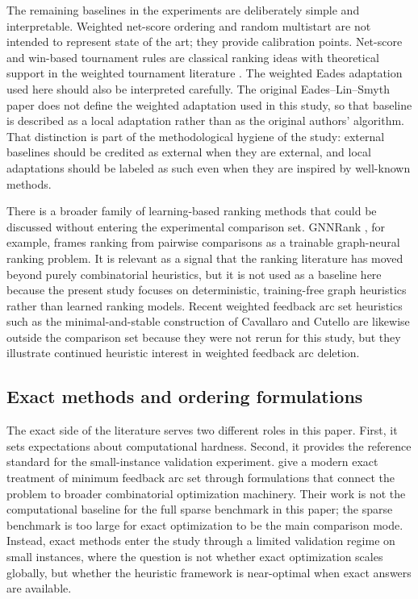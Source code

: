 The remaining baselines in the experiments are deliberately simple and interpretable. Weighted net-score ordering and random multistart are not intended to represent state of the art; they provide calibration points. Net-score and win-based tournament rules are classical ranking ideas with theoretical support in the weighted tournament literature \cite{CFR10}. The weighted Eades adaptation used here should also be interpreted carefully. The original Eades--Lin--Smyth paper \cite{ELS93} does not define the weighted adaptation used in this study, so that baseline is described as a local adaptation rather than as the original authors' algorithm. That distinction is part of the methodological hygiene of the study: external baselines should be credited as external when they are external, and local adaptations should be labeled as such even when they are inspired by well-known methods.

There is a broader family of learning-based ranking methods that could be discussed without entering the experimental comparison set. GNNRank \cite{GNNRank22}, for example, frames ranking from pairwise comparisons as a trainable graph-neural ranking problem. It is relevant as a signal that the ranking literature has moved beyond purely combinatorial heuristics, but it is not used as a baseline here because the present study focuses on deterministic, training-free graph heuristics rather than learned ranking models. Recent weighted feedback arc set heuristics such as the minimal-and-stable construction of Cavallaro and Cutello \cite{CC25} are likewise outside the comparison set because they were not rerun for this study, but they illustrate continued heuristic interest in weighted feedback arc deletion.

\subsection{Exact methods and ordering formulations}

The exact side of the literature serves two different roles in this paper. First, it sets expectations about computational hardness. Second, it provides the reference standard for the small-instance validation experiment. \cite{BSNA21} give a modern exact treatment of minimum feedback arc set through formulations that connect the problem to broader combinatorial optimization machinery. Their work is not the computational baseline for the full sparse benchmark in this paper; the sparse benchmark is too large for exact optimization to be the main comparison mode. Instead, exact methods enter the study through a limited validation regime on small instances, where the question is not whether exact optimization scales globally, but whether the heuristic framework is near-optimal when exact answers are available.

